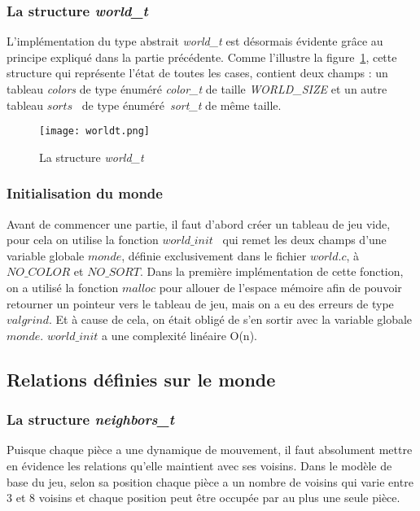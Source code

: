 \documentclass[11pt]{article}
\begin{document}
            \subsubsection{La structure \textit{world\_t} }%
                L'implémentation du type abstrait \textit{world\_t} est désormais évidente grâce au principe expliqué dans la partie précédente. Comme l'illustre la figure~\ref{figure3}, cette structure qui représente l'état de toutes les cases, contient deux champs : un tableau \textit{colors} de type énuméré \textit{color\_t} de taille \textit{WORLD\_SIZE} et un autre tableau $sorts$ \ de type énuméré\ \textit{sort\_t}  de même taille.
                \begin{figure}[h]
                \centering
                \texttt{[image: worldt.png]}
                \caption{La structure \textit{world\_t} }
                \label{figure3}
                \end{figure}
                \newpage
            \subsubsection{Initialisation du monde}
                Avant de commencer une partie, il faut d'abord créer un tableau de jeu vide, pour cela on utilise la fonction $world\_init$ \ qui remet les deux champs d'une variable globale $monde$, définie exclusivement dans le fichier $world.c$, à $NO\_COLOR$ et $NO\_SORT$. Dans la première implémentation de cette fonction, on a utilisé la fonction $malloc$ pour allouer de l'espace mémoire afin de pouvoir retourner un pointeur vers le tableau de jeu, mais on a eu des erreurs de type $valgrind$. Et à cause de cela, on était obligé de s'en sortir avec la variable globale $monde$. $world\_init$ a une complexité linéaire O(n).
        \subsection{Relations définies sur le monde}
            \subsubsection{La structure \textit{neighbors\_t} } %
                Puisque chaque pièce a une dynamique de mouvement, il faut absolument mettre en évidence les relations qu'elle maintient avec ses voisins. Dans le modèle de base du jeu, selon sa position chaque pièce a un nombre de voisins qui varie entre 3 et 8 voisins et chaque position peut être occupée par au plus une seule pièce.
                
\end{document}
